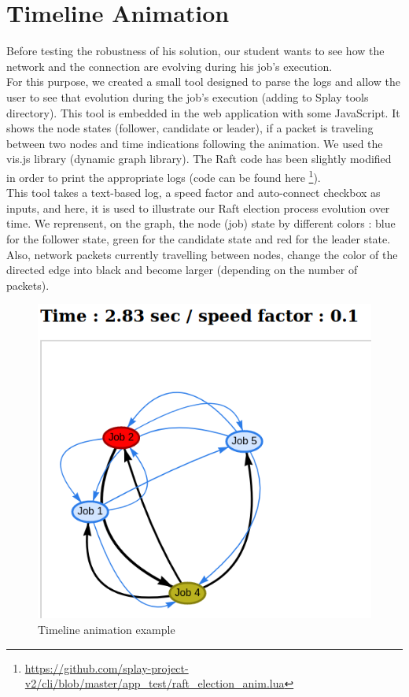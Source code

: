 \documentclass{eplmastersthesis}
\begin{document}
    \section{Timeline Animation}

      Before testing the robustness of his solution, our student wants to
      see how the network and the connection are evolving during his job's
      execution.\\
      For this purpose, we created a small tool designed to parse the
      logs and allow the user to see that evolution during the job's
      execution (adding to Splay tools directory). 
      This tool is embedded in the web application with some
      JavaScript. It shows the node states (follower, candidate or leader),
      if a packet is traveling between two nodes and time
      indications following the animation. We used the vis.js library
      \cite{VisJS} (dynamic graph library). The Raft code has been slightly
      modified in order to print the appropriate logs (code can be found here
      \footnote{\url{https://github.com/splay-project-v2/cli/blob/master/app_test/raft_election_anim.lua}}).\\

      This tool takes a text-based log, a speed factor and auto-connect
      checkbox as inputs, and here, it is used to illustrate our Raft election
      process evolution over time. We reprensent, on the graph, the node (job) state
      by different colors : blue for the follower state, green for the candidate state and red for the leader state.
      Also, network packets currently travelling between nodes, change the color
      of the directed edge into black and become larger (depending on the number of packets).\\

      \begin{figure}[H]
        \centering
        \includegraphics[width=0.4\linewidth]{figures/user_case/anim_pres.png}
        \caption{Timeline animation example}
      \end{figure}
\end{document}
